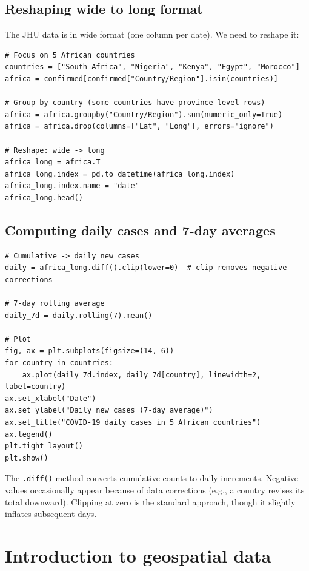 \subsection{Reshaping wide to long format}

The JHU data is in wide format (one column per date). We need to reshape it:

\begin{verbatim}
# Focus on 5 African countries
countries = ["South Africa", "Nigeria", "Kenya", "Egypt", "Morocco"]
africa = confirmed[confirmed["Country/Region"].isin(countries)]

# Group by country (some countries have province-level rows)
africa = africa.groupby("Country/Region").sum(numeric_only=True)
africa = africa.drop(columns=["Lat", "Long"], errors="ignore")

# Reshape: wide -> long
africa_long = africa.T
africa_long.index = pd.to_datetime(africa_long.index)
africa_long.index.name = "date"
africa_long.head()
\end{verbatim}

\subsection{Computing daily cases and 7-day averages}

\begin{verbatim}
# Cumulative -> daily new cases
daily = africa_long.diff().clip(lower=0)  # clip removes negative corrections

# 7-day rolling average
daily_7d = daily.rolling(7).mean()

# Plot
fig, ax = plt.subplots(figsize=(14, 6))
for country in countries:
    ax.plot(daily_7d.index, daily_7d[country], linewidth=2, label=country)
ax.set_xlabel("Date")
ax.set_ylabel("Daily new cases (7-day average)")
ax.set_title("COVID-19 daily cases in 5 African countries")
ax.legend()
plt.tight_layout()
plt.show()
\end{verbatim}

\begin{clinicalnote}
The \texttt{.diff()} method converts cumulative counts to daily increments. Negative values occasionally appear because of data corrections (e.g., a country revises its total downward). Clipping at zero is the standard approach, though it slightly inflates subsequent days.
\end{clinicalnote}

\section{Introduction to geospatial data}

